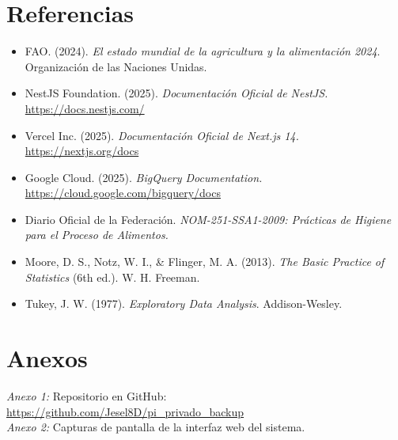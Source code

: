 \documentclass[12pt, a4paper]{article}
\begin{document}
\section{Referencias}
\begin{itemize}
    \item FAO. (2024). \textit{El estado mundial de la agricultura y la alimentación 2024}. Organización de las Naciones Unidas.
    \item NestJS Foundation. (2025). \textit{Documentación Oficial de NestJS.} \url{https://docs.nestjs.com/}
    \item Vercel Inc. (2025). \textit{Documentación Oficial de Next.js 14.} \url{https://nextjs.org/docs}
    \item Google Cloud. (2025). \textit{BigQuery Documentation.} \url{https://cloud.google.com/bigquery/docs}
    \item Diario Oficial de la Federación. \textit{NOM-251-SSA1-2009: Prácticas de Higiene para el Proceso de Alimentos.}
    \item Moore, D. S., Notz, W. I., \& Flinger, M. A. (2013). \textit{The Basic Practice of Statistics} (6th ed.). W. H. Freeman.
    \item Tukey, J. W. (1977). \textit{Exploratory Data Analysis}. Addison-Wesley.
\end{itemize}

\section{Anexos}
\textit{Anexo 1:} Repositorio en GitHub: \url{https://github.com/Jesel8D/pi_privado_backup}\\
\textit{Anexo 2:} Capturas de pantalla de la interfaz web del sistema.\\
\end{document}
